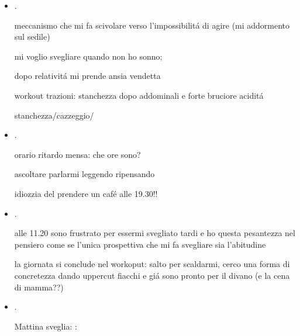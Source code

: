 \begin{itemize}
: mensa 

nel pomeriggio sono  finch\'e non mi addormento in attesa delle 19

cus incommensurabilit\'a atleti/inferiorit\'a incoscente rispetto a determinati soma

\item {}.

meccanismo che mi fa scivolare verso l'impossibilit\'a di agire (mi addormento sul sedile)

mi voglio svegliare quando non ho sonno;


dopo relativit\'a mi prende ansia vendetta 

workout trazioni: stanchezza dopo addominali e forte bruciore acidit\'a

stanchezza/cazzeggio/ 

\item {}.

orario ritardo mensa: che ore sono?

ascoltare parlarmi leggendo ripensando

idiozzia del prendere un caf\'e alle 19.30!! 


\item {}.

alle 11.20 sono frustrato per essermi svegliato tardi e ho questa pesantezza nel pensiero come se l'unica prospettiva che mi fa svegliare sia l'abitudine

la giornata si conclude nel workoput: salto per scaldarmi, cerco una forma di concretezza dando uppercut fiacchi e gi\'a sono pronto per il divano (e la cena di mamma??)


\item {}.

Mattina sveglia: : 


\end{itemize}
